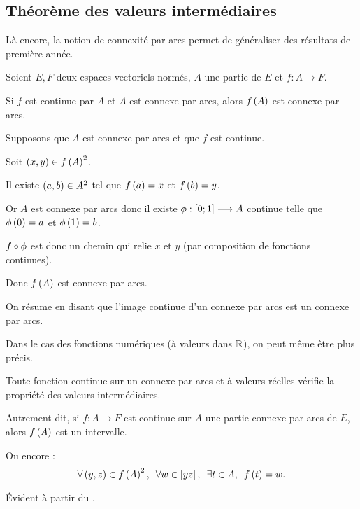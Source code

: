\subsection{Théorème des valeurs intermédiaires}

Là encore, la notion de connexité par arcs permet de généraliser des résultats de première année.

\begin{theo}
Soient \(E,F\) deux espaces vectoriels normés, \(A\) une partie de \(E\) et \(f:A\to F\).

Si \(f\) est continue par \(A\) et \(A\) est connexe par arcs, alors \(f\left(A\right)\) est connexe par arcs.
\end{theo}

\begin{dem}
Supposons que \(A\) est connexe par arcs et que \(f\) est continue.

Soit \(\left(x,y\right)\in f\left(A\right)^2\).

Il existe \(\left(a,b\right)\in A^2\) tel que \(f\left(a\right)=x\) et \(f\left(b\right)=y\).

Or \(A\) est connexe par arcs donc il existe \(\phi:\left[0;1\right]\longrightarrow A\) continue telle que \(\phi\left(0\right)=a\) et \(\phi\left(1\right)=b\).

\(f\circ\phi\) est donc un chemin qui relie \(x\) et \(y\) (par composition de fonctions continues).

Donc \(f\left(A\right)\) est connexe par arcs.
\end{dem}

On résume en disant que l'image continue d'un connexe par arcs est un connexe par arcs.

Dans le cas des fonctions numériques (\ie à valeurs dans \(\mathbb{R}\)), on peut même être plus précis.

\begin{theo}
Toute fonction continue sur un connexe par arcs et à valeurs réelles vérifie la propriété des valeurs intermédiaires.

Autrement dit, si \(f:A\to F\) est continue sur \(A\) une partie connexe par arcs de \(E\), alors \(f\left(A\right)\) est un intervalle.

Ou encore : \[\quantifs{\forall\paren{y,z}\in f\paren{A}^2;\forall w\in\croch{yz};\exists t\in A}f\paren{t}=w.\]
\end{theo}

\begin{dem}
Évident à partir du .
\end{dem}
